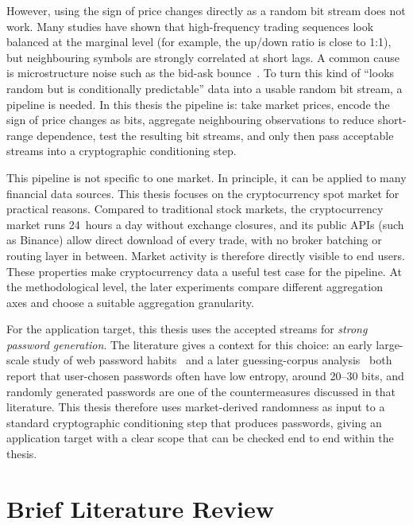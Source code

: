 \documentclass[11pt,titlepage,openany,oneside]{book}  %
\begin{document}
However, using the sign of price changes directly as a random bit stream does not work. Many studies have shown that high-frequency trading sequences look balanced at the marginal level (for example, the up/down ratio is close to 1:1), but neighbouring symbols are strongly correlated at short lags. A common cause is microstructure noise such as the bid-ask bounce~\citep{cont2001stylized,shternshis2025predictability}. To turn this kind of ``looks random but is conditionally predictable'' data into a usable random bit stream, a pipeline is needed. In this thesis the pipeline is: take market prices, encode the sign of price changes as bits, aggregate neighbouring observations to reduce short-range dependence, test the resulting bit streams, and only then pass acceptable streams into a cryptographic conditioning step.

This pipeline is not specific to one market. In principle, it can be applied to many financial data sources. This thesis focuses on the cryptocurrency spot market for practical reasons. Compared to traditional stock markets, the cryptocurrency market runs 24~hours a day without exchange closures, and its public APIs (such as Binance) allow direct download of every trade, with no broker batching or routing layer in between. Market activity is therefore directly visible to end users. These properties make cryptocurrency data a useful test case for the pipeline. At the methodological level, the later experiments compare different aggregation axes and choose a suitable aggregation granularity.

For the application target, this thesis uses the accepted streams for \emph{strong password generation}. The literature gives a context for this choice: an early large-scale study of web password habits~\citep{florencio2007webpassword} and a later guessing-corpus analysis~\citep{bonneau2012guessing} both report that user-chosen passwords often have low entropy, around 20--30 bits, and randomly generated passwords are one of the countermeasures discussed in that literature. This thesis therefore uses market-derived randomness as input to a standard cryptographic conditioning step that produces passwords, giving an application target with a clear scope that can be checked end to end within the thesis.

\section{Brief Literature Review}
\label{sec:brief-lit-review}
\end{document}

